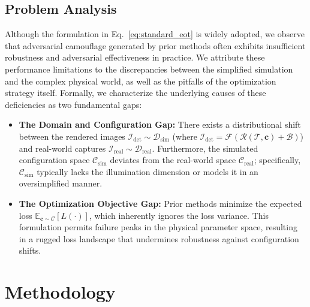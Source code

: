 \documentclass[10pt,journal,compsoc]{IEEEtran}
\begin{document}
\subsection{Problem Analysis}
\label{sec:3.3}
Although the formulation in Eq.~\ref{eq:standard_eot} is widely adopted, we observe that adversarial camouflage generated by prior methods often exhibits insufficient robustness and adversarial effectiveness in practice. 
We attribute these performance limitations to the discrepancies between the simplified simulation and the complex physical world, as well as the pitfalls of the optimization strategy itself. 
Formally, we characterize the underlying causes of these deficiencies as two fundamental gaps:
\begin{itemize}

\item \textbf{The Domain and Configuration Gap:} There exists a distributional shift between the rendered images $\mathcal{I}_{\text{det}} \sim \mathcal{D}_{\text{sim}}$ (where $\mathcal{I}_{\text{det}} = \mathcal{F}(\mathcal{R}(\bm{\mathcal{T}}, \bm{c})+\mathcal{B})$) and real-world captures $\mathcal{I}_{\text{real}} \sim \mathcal{D}_{\text{real}}$.
Furthermore, the simulated configuration space $\mathcal{C}_{\text{sim}}$ deviates from the real-world space $\mathcal{C}_{\text{real}}$; specifically, $\mathcal{C}_{\text{sim}}$ typically lacks the illumination dimension or models it in an oversimplified manner.

\item \textbf{The Optimization Objective Gap:} Prior methods minimize the expected loss $\mathbb{E}_{\bm{c} \sim \mathcal{C}}[L(\cdot)]$, which inherently ignores the loss variance. This formulation permits failure peaks in the physical parameter space, resulting in a rugged loss landscape that undermines robustness against configuration shifts.

\end{itemize}


% 
\section{Methodology}
\end{document}
